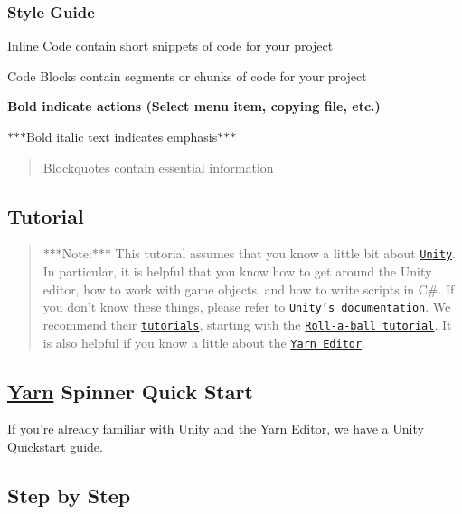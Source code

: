 \subsubsection*{Style Guide}

{\ttfamily Inline Code} contain short snippets of code for your project \begin{DoxyVerb}Code Blocks contain segments or chunks of code for your project
\end{DoxyVerb}


{\bfseries Bold indicate actions (Select menu item, copying file, etc.)}

$\ast$$\ast$$\ast$\-Bold italic text indicates emphasis$\ast$$\ast$$\ast$

\begin{quotation}
Blockquotes contain essential information

\end{quotation}


\subsection*{Tutorial}

\begin{quotation}
$\ast$$\ast$$\ast$\-Note\-:$\ast$$\ast$$\ast$ This tutorial assumes that you know a little bit about \href{http://www.unity3d.com}{\tt Unity}. In particular, it is helpful that you know how to get around the Unity editor, how to work with game objects, and how to write scripts in C\#. If you don't know these things, please refer to \href{http://unity3d.com/learn}{\tt Unity's documentation}. We recommend their \href{https://unity3d.com/learn/tutorials/}{\tt tutorials}, starting with the \href{https://unity3d.com/learn/tutorials/projects/roll-ball-tutorial}{\tt Roll-\/a-\/ball tutorial}. It is also helpful if you know a little about the \href{https://github.com/InfiniteAmmoInc/Yarn}{\tt Yarn Editor}.

\end{quotation}


\subsection*{\hyperlink{a00040}{Yarn} Spinner Quick Start}

If you're already familiar with Unity and the \hyperlink{a00040}{Yarn} Editor, we have a \hyperlink{a00121}{Unity Quickstart} guide.

\subsection*{Step by Step}

